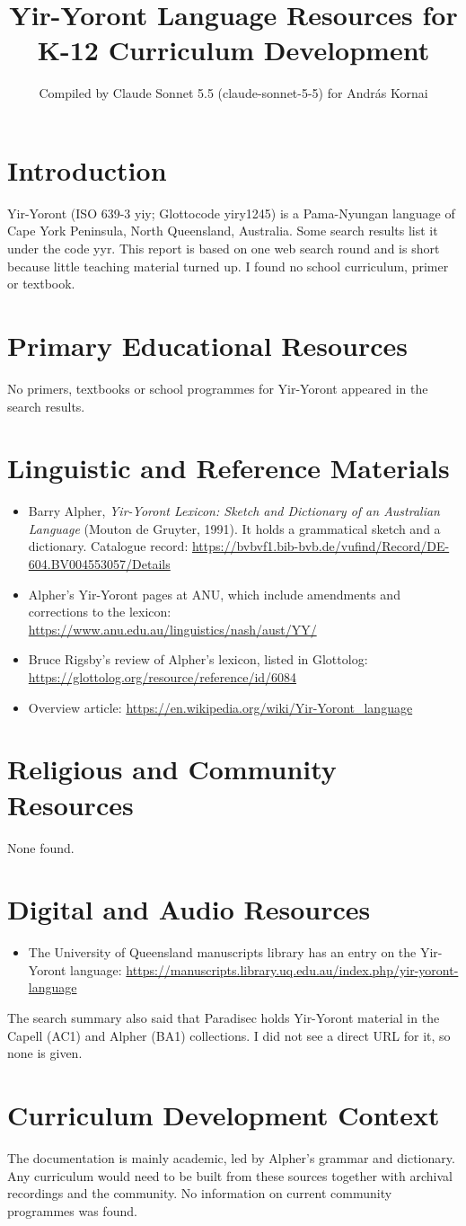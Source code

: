 \documentclass[12pt]{article}
\title{Yir-Yoront Language Resources for K-12 Curriculum Development}
\author{Compiled by Claude Sonnet 5.5 (claude-sonnet-5-5) for Andr\'as Kornai}
\date{}
\begin{document}
\maketitle

\section{Introduction}
Yir-Yoront (ISO 639-3 yiy; Glottocode yiry1245) is a Pama-Nyungan language of Cape York Peninsula, North Queensland, Australia. Some search results list it under the code yyr. This report is based on one web search round and is short because little teaching material turned up. I found no school curriculum, primer or textbook.

\section{Primary Educational Resources}
No primers, textbooks or school programmes for Yir-Yoront appeared in the search results.

\section{Linguistic and Reference Materials}
\begin{itemize}
\item Barry Alpher, \emph{Yir-Yoront Lexicon: Sketch and Dictionary of an Australian Language} (Mouton de Gruyter, 1991). It holds a grammatical sketch and a dictionary. Catalogue record: \url{https://bvbvf1.bib-bvb.de/vufind/Record/DE-604.BV004553057/Details}
\item Alpher's Yir-Yoront pages at ANU, which include amendments and corrections to the lexicon: \url{https://www.anu.edu.au/linguistics/nash/aust/YY/}
\item Bruce Rigsby's review of Alpher's lexicon, listed in Glottolog: \url{https://glottolog.org/resource/reference/id/6084}
\item Overview article: \url{https://en.wikipedia.org/wiki/Yir-Yoront_language}
\end{itemize}

\section{Religious and Community Resources}
None found.

\section{Digital and Audio Resources}
\begin{itemize}
\item The University of Queensland manuscripts library has an entry on the Yir-Yoront language: \url{https://manuscripts.library.uq.edu.au/index.php/yir-yoront-language}
\end{itemize}
The search summary also said that Paradisec holds Yir-Yoront material in the Capell (AC1) and Alpher (BA1) collections. I did not see a direct URL for it, so none is given.

\section{Curriculum Development Context}
The documentation is mainly academic, led by Alpher's grammar and dictionary. Any curriculum would need to be built from these sources together with archival recordings and the community. No information on current community programmes was found.
\end{document}
